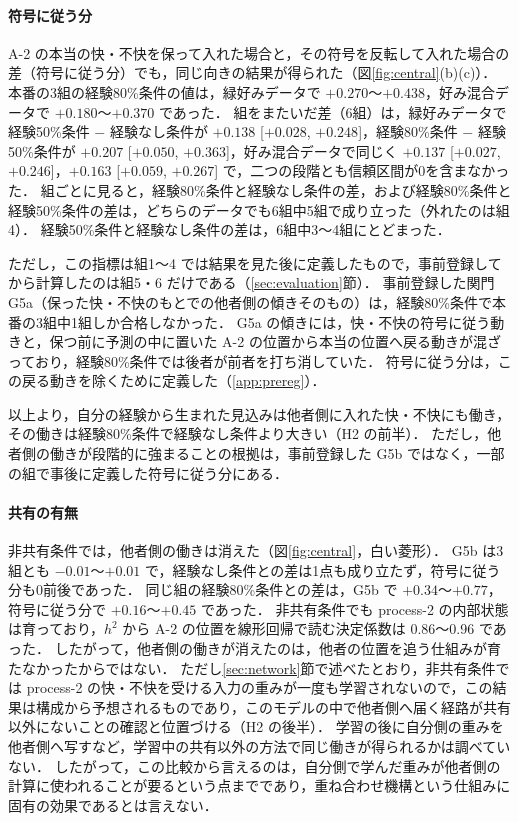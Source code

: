 \paragraph{符号に従う分}
A-2 の本当の快・不快を保って入れた場合と，その符号を反転して入れた場合の差（符号に従う分）でも，同じ向きの結果が得られた（図\ref{fig:central}(b)(c)）．
本番の3組の経験80\%条件の値は，緑好みデータで $+0.270$〜$+0.438$，好み混合データで $+0.180$〜$+0.370$ であった．
組をまたいだ差（6組）は，緑好みデータで経験50\%条件 $-$ 経験なし条件が $+0.138$ [$+0.028$, $+0.248$]，経験80\%条件 $-$ 経験50\%条件が $+0.207$ [$+0.050$, $+0.363$]，好み混合データで同じく $+0.137$ [$+0.027$, $+0.246$]，$+0.163$ [$+0.059$, $+0.267$] で，二つの段階とも信頼区間が0を含まなかった．
組ごとに見ると，経験80\%条件と経験なし条件の差，および経験80\%条件と経験50\%条件の差は，どちらのデータでも6組中5組で成り立った（外れたのは組4）．
経験50\%条件と経験なし条件の差は，6組中3〜4組にとどまった．

ただし，この指標は組1〜4 では結果を見た後に定義したもので，事前登録してから計算したのは組5・6 だけである（\ref{sec:evaluation}節）．
事前登録した関門 G5a（保った快・不快のもとでの他者側の傾きそのもの）は，経験80\%条件で本番の3組中1組しか合格しなかった．
G5a の傾きには，快・不快の符号に従う動きと，保つ前に予測の中に置いた A-2 の位置から本当の位置へ戻る動きが混ざっており，経験80\%条件では後者が前者を打ち消していた．
符号に従う分は，この戻る動きを除くために定義した（\ref{app:prereg}）．

以上より，自分の経験から生まれた見込みは他者側に入れた快・不快にも働き，その働きは経験80\%条件で経験なし条件より大きい（H2 の前半）．
ただし，他者側の働きが段階的に強まることの根拠は，事前登録した G5b ではなく，一部の組で事後に定義した符号に従う分にある．

\paragraph{共有の有無}
非共有条件では，他者側の働きは消えた（図\ref{fig:central}，白い菱形）．
G5b は3組とも $-0.01$〜$+0.01$ で，経験なし条件との差は1点も成り立たず，符号に従う分も0前後であった．
同じ組の経験80\%条件との差は，G5b で $+0.34$〜$+0.77$，符号に従う分で $+0.16$〜$+0.45$ であった．
非共有条件でも process-2 の内部状態は育っており，$h^2$ から A-2 の位置を線形回帰で読む決定係数は 0.86〜0.96 であった．
したがって，他者側の働きが消えたのは，他者の位置を追う仕組みが育たなかったからではない．
ただし\ref{sec:network}節で述べたとおり，非共有条件では process-2 の快・不快を受ける入力の重みが一度も学習されないので，この結果は構成から予想されるものであり，このモデルの中で他者側へ届く経路が共有以外にないことの確認と位置づける（H2 の後半）．
学習の後に自分側の重みを他者側へ写すなど，学習中の共有以外の方法で同じ働きが得られるかは調べていない．
したがって，この比較から言えるのは，自分側で学んだ重みが他者側の計算に使われることが要るという点までであり，重ね合わせ機構という仕組みに固有の効果であるとは言えない．

